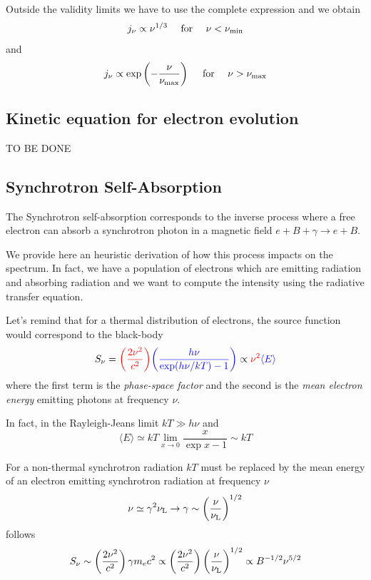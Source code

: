 
Outside the validity limits we have to use the complete expression and we obtain 
%
\begin{equation*}
j_\nu \propto \nu^{1/3} \quad\text{ for }\quad \nu < \nu_{\rm min}
\end{equation*}
%
and
%
\begin{equation*}
j_\nu \propto \exp \left(-\frac{\nu}{\nu_{\rm max}}\right) \quad\text{ for }\quad \nu > \nu_{\rm max}
\end{equation*}

\subsection{Kinetic equation for electron evolution}

TO BE DONE

\subsection{Synchrotron Self-Absorption}

The Synchrotron self-absorption corresponds to the inverse process where a free electron can absorb a synchrotron photon in a magnetic field $e+B+\gamma\rightarrow e+B$.

We provide here an heuristic derivation of how this process impacts on the spectrum. In fact, we have a population of electrons which are emitting radiation and absorbing radiation and we want to compute the intensity using the radiative transfer equation.

Let's remind that for a thermal distribution of electrons, the source function would correspond to the black-body
%
\[
S_\nu = {\color{red}\left(\frac{2\nu^2}{c^2}\right)} {\color{blue}\left(\frac{h\nu}{\exp(h\nu / kT) - 1}\right)} 
\propto {\color{red}\nu^2} {\color{blue}\langle E \rangle}
\]
%
where the first term is the \emph{phase-space factor} and the second is the \emph{mean electron energy} emitting photons at frequency $\nu$.

In fact, in the Rayleigh-Jeans limit $kT \gg h\nu$ and
%
\[
\langle E \rangle \simeq kT \lim_{x\rightarrow 0} \frac{x}{\exp x - 1} \sim kT
\]

For a non-thermal synchrotron radiation $kT$ must be replaced by the mean energy of an electron emitting synchrotron radiation at frequency $\nu$
%
\begin{equation*}
\nu \simeq \gamma^2 \nu_{\rm L} \rightarrow \gamma \sim \left(\frac{\nu}{\nu_{\rm L}}\right)^{1/2}
\end{equation*}
%
follows
%
\begin{equation*}
S_\nu \sim \left( \frac{2\nu^2}{c^2} \right) \gamma m_e c^2
\propto \left( \frac{2\nu^2}{c^2} \right) \left(\frac{\nu}{\nu_{\rm L}}\right)^{1/2} 
\propto B^{-1/2} \nu^{5/2} 
\end{equation*}

